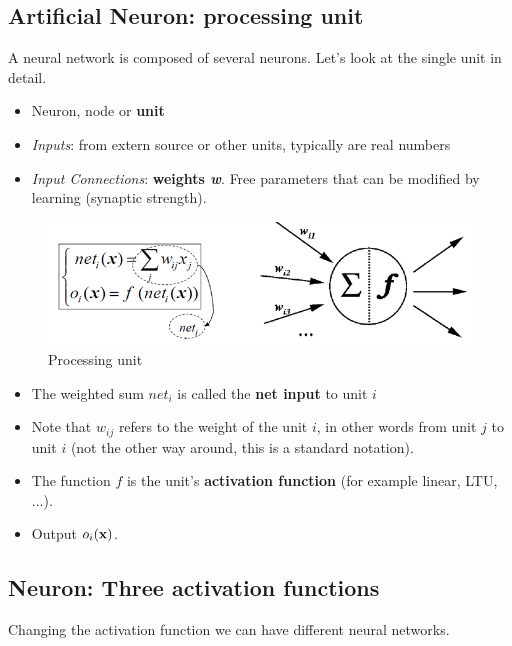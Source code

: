 \documentclass[../main.tex]{subfiles}
\begin{document}
\subsection{Artificial Neuron: processing unit}
A neural network is composed of several neurons. Let's look at the single unit in detail.
\begin{itemize}
    \item Neuron, node or \textbf{unit}
    \item \emph{Inputs}: from extern source or other units, typically are real numbers
    \item \emph{Input Connections}: \textbf{weights \emph{w}}. Free parameters that can be modified by learning (synaptic strength).
\end{itemize}
\begin{figure}[H]
    \centering
    \includegraphics[scale = 0.6]{lectures/4_neural_networks/4_neuron.png}
    \caption{Processing unit}
    \label{fig:neuron}
\end{figure}
\begin{itemize}
    \item The weighted sum $net_i$ is called the \textbf{net input} to unit $i$
    \item Note that $w_{ij}$ refers to the weight of the unit $i$, in other words from unit $j$ to unit $i$ (not the other way around, this is a standard notation).
    \item The function $f$ is the unit's \textbf{activation function} (for example linear, LTU, ...).
    \item Output $o_i(\bold{x})$.
\end{itemize}

\subsection{Neuron: Three activation functions}
Changing the activation function we can have different neural networks.
\end{document}
